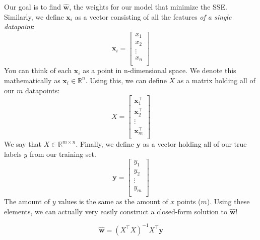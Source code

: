     Our goal is to find $\hat{\textbf{w}}$, the weights for our model that minimize the SSE. Similarly, we define $\textbf{x}_i$ as a vector consisting of all the features \textit{of a single datapoint}:
    $$\textbf{x}_i = \begin{bmatrix}
            x_1\\
            x_2\\
            \vdots\\
            x_n\\
            \end{bmatrix}$$
    You can think of each $\textbf{x}_i$ as a point in n-dimensional space. We denote this mathematically as $\textbf{x}_i \in \mathbb{R}^n$. Using this, we can define $X$ as a matrix holding all of our $m$ datapoints:
    $$X = \begin{bmatrix}
            \textbf{x}_1^{\top}\\
            \textbf{x}_2^{\top}\\
            \vdots\\
            \textbf{x}_m^{\top}\\
            \end{bmatrix}$$
    We say that $X \in \mathbb{R}^{m \times n}$. Finally, we define $\textbf{y}$ as a vector holding all of our true labels $y$ from our training set.
    $$\textbf{y} = \begin{bmatrix}
            y_1\\
            y_2\\
            \vdots\\
            y_m\\
            \end{bmatrix}$$
    The amount of $y$ values is the same as the amount of $x$ points ($m$). Using these elements, we can actually very easily construct a closed-form solution to $\hat{\textbf{w}}$!

    $$\hat{\textbf{w}} = (X^{\top}X)^{-1}X^{\top}\textbf{y}$$

